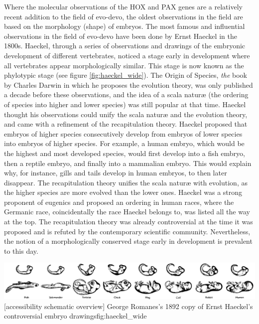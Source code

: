 Where the molecular observations of the HOX and PAX genes are a relatively recent addition to the field of evo-devo, the oldest observations in the field are based on the morphology (shape) of embryos. The most famous and influential observations in the field of evo-devo have been done by Ernst Haeckel in the 1800s\cite{haeckel1866}. Haeckel, through a series of observations and drawings of the embryonic development of different vertebrates, noticed a stage early in development where all vertebrates appear morphologically similar. This stage is now known as the phylotypic stage (see figure \ref{fig:haeckel_wide}). The Origin of Species, \textit{the} book by Charles Darwin in which he proposes the evolution theory, was only published a decade before these observations, and the idea of a scala naturæ (the ordering of species into higher and lower species) was still popular at that time. Haeckel thought his observations could unify the scala naturæ and the evolution theory, and came with a refinement of the recapitulation theory. Haeckel proposed that embryos of higher species consecutively develop from embryos of lower species into embryos of higher species. For example, a human embryo, which would be the highest and most developed species, would first develop into a fish embryo, then a reptile embryo, and finally into a mammalian embryo. This would explain why, for instance, gills and tails develop in human embryos, to then later disappear. The recapitulation theory unifies the scala naturæ with evolution, as the higher species are more evolved than the lower ones. Haeckel was a strong proponent of eugenics and proposed an ordering in human races, where the Germanic race, coincidentally the race Haeckel belongs to, was listed all the way at the top\cite{Levit2020}. The recapitulation theory was already controversial at the time it was proposed and is refuted by the contemporary scientific community. Nevertheless, the notion of a morphologically conserved stage early in development is prevalent to this day.

{\includegraphics[width=2.2\textwidth]
{ch.introduction/imgs/haeckel_wide.png}}
[accessibility schematic overview]
{George Romanes's 1892 copy of Ernst Haeckel's controversial embryo drawings}{fig:haeckel_wide}

